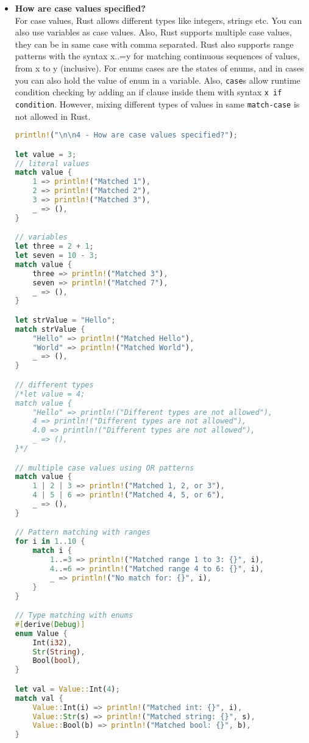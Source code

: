 \documentclass{article}
\begin{document}
\begin{itemize}
\item \textbf{How are case values specified?} \\
For case values, Rust allows different types like integers, strings etc. You can also use variables as case values. Also, Rust supports multiple case values, they can be in same case with comma separated. Rust also supports range patterns with the syntax x..=y for matching continuous sequences of values, from x to y (inclusive). For enums cases are the states of enums, and in cases you can also hold the value of enum in a variable. Also, \texttt{case}s allow runtime condition checking by adding an if clause inside them with syntax \texttt{x if condition}. However, mixing different types of values in same \texttt{match-case} is not allowed in Rust.
\begin{lstlisting}[language=Rust]
println!("\n\n4 - How are case values specified?");

let value = 3;
// literal values
match value {
    1 => println!("Matched 1"),
    2 => println!("Matched 2"),
    3 => println!("Matched 3"),
    _ => (),
}

// variables
let three = 2 + 1;
let seven = 10 - 3;
match value {
    three => println!("Matched 3"),
    seven => println!("Matched 7"),
    _ => (),
}

let strValue = "Hello";
match strValue {
    "Hello" => println!("Matched Hello"),
    "World" => println!("Matched World"),
    _ => (),
}

// different types
/*let value = 4;
match value {
    "Hello" => println!("Different types are not allowed"),
    4 => println!("Different types are not allowed"),
    4.0 => println!("Different types are not allowed"),
    _ => (),
}*/

// multiple case values using OR patterns
match value {
    1 | 2 | 3 => println!("Matched 1, 2, or 3"),
    4 | 5 | 6 => println!("Matched 4, 5, or 6"),
    _ => (),
}

// Pattern matching with ranges
for i in 1..10 {
    match i {
        1..=3 => println!("Matched range 1 to 3: {}", i),
        4..=6 => println!("Matched range 4 to 6: {}", i),
        _ => println!("No match for: {}", i),
    }
}

// Type matching with enums
#[derive(Debug)]
enum Value {
    Int(i32),
    Str(String),
    Bool(bool),
}

let val = Value::Int(4);
match val {
    Value::Int(i) => println!("Matched int: {}", i),
    Value::Str(s) => println!("Matched string: {}", s),
    Value::Bool(b) => println!("Matched bool: {}", b),
}


\end{lstlisting}
\end{itemize}
\end{document}
